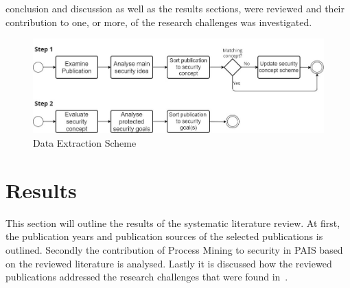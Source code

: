 \documentclass[runningheads]{llncs}
\begin{document}
conclusion and discussion as well as the results sections, were reviewed and their contribution to one, or more, of the research challenges was investigated.
\begin{figure}
    \includegraphics[width = \textwidth]{figures/extraction.jpg}
    \caption{Data Extraction Scheme}
    \label{extract_scheme}
\end{figure}
\section{Results}\label{Results}
This section will outline the results of the systematic literature review. At first, the publication years and publication sources of the selected publications is outlined. Secondly the
contribution of Process Mining to security in PAIS based on the reviewed literature is analysed. Lastly it is discussed how the reviewed publications addressed the research challenges that
were found in~\cite{Leitner2014273}.
\end{document}
